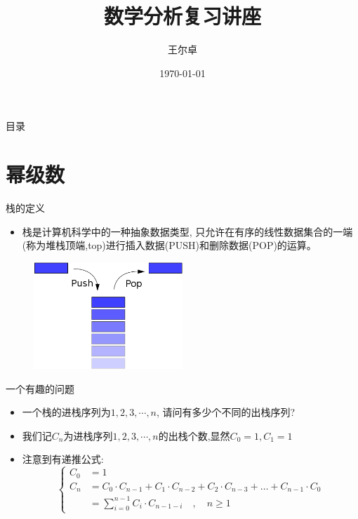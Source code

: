 \documentclass{beamer}
\title{数学分析复习讲座}
\institute{强基数学2101}
\author{王尔卓}
\date{\today}
\theoremstyle{definition}
\begin{document}
\begin{frame}
    \titlepage
\end{frame}

\begin{frame}{目录}
    \tableofcontents
\end{frame}

\section{幂级数}
\begin{frame}{栈的定义}
    \begin{itemize}
        \item 栈是计算机科学中的一种抽象数据类型,
              只允许在有序的线性数据集合的一端(称为堆栈顶端,top)进行插入数据(PUSH)和删除数据(POP)的运算。
    \end{itemize}
    \begin{figure}
        \centering
        \includegraphics[width=0.5\textwidth]{stack.png}
    \end{figure}
\end{frame}
\begin{frame}{一个有趣的问题}
    \begin{itemize}
        \pause
        \item 一个栈的进栈序列为$1,2,3,\cdots,n$, 请问有多少个不同的出栈序列?
              \pause
        \item 我们记$C_n$为进栈序列$1,2,3,\cdots,n$的出栈个数,显然$C_0=1,C_1=1$
              \pause
        \item 注意到有递推公式:
              \begin{equation*}
                  \left\{\begin{aligned}
                      C_0 & =1                                                                              \\
                      C_n & =C_0 \cdot C_{n-1}+C_1 \cdot C_{n-2}+C_2 \cdot C_{n-3}+\ldots+C_{n-1} \cdot C_0 \\
                          & =\sum_{i=0}^{n-1} C_i \cdot C_{n-1-i} \quad, \quad n \geq 1
                  \end{aligned}\right.
              \end{equation*}
    \end{itemize}
\end{frame}
\end{document}
